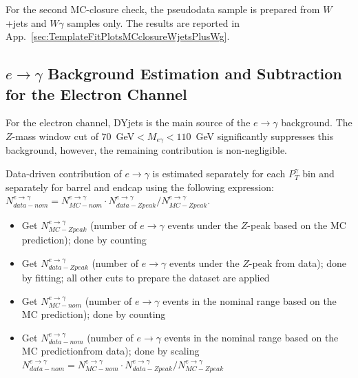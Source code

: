 For the second MC-closure check, the pseudodata sample is prepared from $W$+jets and $W\gamma$ samples only. The results are reported in App.~\ref{sec:TemplateFitPlotsMCclosureWjetsPlusWg}. 

\subsection{$e\rightarrow\gamma$ Background Estimation and Subtraction for the Electron Channel}
\label{sec:BackgroundSubtraction_etog}

For the electron channel, DYjets is the main source of the $e \rightarrow \gamma$ background. The $Z$-mass window cut of $70$~GeV$<M_{e\gamma}<110$~GeV significantly suppresses this background, however, the remaining contribution is non-negligible. 

Data-driven contribution of $e\rightarrow\gamma$ is estimated separately for each $P_{T}^{\gamma}$ bin and separately for barrel and endcap using the following expression: $N_{data-nom}^{e\rightarrow\gamma} = N_{MC-nom}^{e\rightarrow\gamma} \cdot N_{data-Zpeak}^{e\rightarrow\gamma}/N_{MC-Zpeak}^{e\rightarrow\gamma}$. 

\begin{itemize}
  \item Get $N_{MC-Zpeak}^{e\rightarrow\gamma}$ (number of $e\rightarrow\gamma$ events under the $Z$-peak based on the MC prediction); done by counting
  \item Get $N_{data-Zpeak}^{e\rightarrow\gamma}$ (number of $e\rightarrow\gamma$ events under the $Z$-peak from data); done by fitting; all other cuts to prepare the dataset are applied
  \item Get $N_{MC-nom}^{e\rightarrow\gamma}$ (number of $e\rightarrow\gamma$ events in the nominal range based on the MC prediction); done by counting
  \item Get $N_{data-nom}^{e\rightarrow\gamma}$ (number of $e\rightarrow\gamma$ events in the nominal range based on the MC predictionfrom data); done by scaling $N_{data-nom}^{e\rightarrow\gamma} = N_{MC-nom}^{e\rightarrow\gamma} \cdot N_{data-Zpeak}^{e\rightarrow\gamma}/N_{MC-Zpeak}^{e\rightarrow\gamma}$
\end{itemize}

